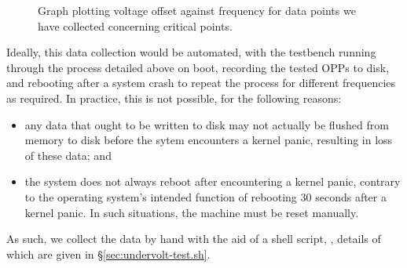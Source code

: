 \begin{figure}[!htb]
    \caption{
        \label{fig:critical-points-graph}
        Graph plotting voltage offset against frequency for data points we have
        collected concerning critical points.
    }
\end{figure}

Ideally, this data collection would be automated, with the testbench running
through the process detailed above on boot, recording the tested OPPs to disk,
and rebooting after a system crash to repeat the process for different
frequencies as required. In practice, this is not possible, for the following
reasons:
\begin{itemize}
    \item any data that ought to be written to disk may not actually be flushed
        from memory to disk before the sytem encounters a kernel panic, 
        resulting in loss of these data; and
    \item the system does not always reboot after encountering a kernel panic,
        contrary to the operating system's intended function of rebooting 30
        seconds after a kernel panic. In such situations, the machine must be
        reset manually.
\end{itemize}

As such, we collect the data by hand with the aid of a shell script,
, details of which are given in
§\ref{sec:undervolt-test.sh}.
